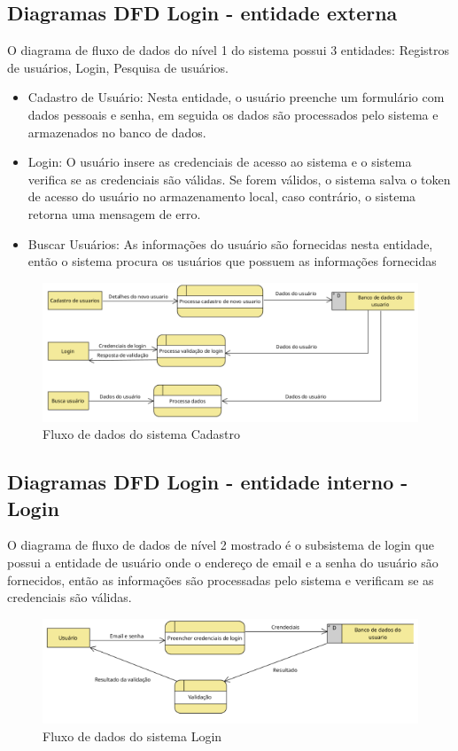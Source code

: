 \subsection{Diagramas DFD Login - entidade externa}
O diagrama de fluxo de dados do nível 1 do sistema possui 3 entidades: Registros de usuários, Login, Pesquisa de usuários.
\begin{itemize}
      \item Cadastro de Usuário: Nesta entidade, o usuário preenche um formulário com dados pessoais e senha, em seguida os dados são processados pelo sistema e armazenados no banco de dados.
      \item Login: O usuário insere as credenciais de acesso ao sistema e o sistema verifica se as credenciais são válidas. Se forem válidos, o sistema salva o token de acesso do usuário no armazenamento local, caso contrário, o sistema retorna uma mensagem de erro.
      \item Buscar Usuários: As informações do usuário são fornecidas nesta entidade, então o sistema procura os usuários que possuem as informações fornecidas

\end{itemize}

\begin{figure}[H]
      \begin{center}
            \includegraphics[width=12cm]{Pictures/diagram/loginNv1.png}
            \caption{Fluxo de dados do sistema Cadastro} \label{loginNV1}
      \end{center}
\end{figure}

\subsection{Diagramas DFD Login - entidade interno - Login}
O diagrama de fluxo de dados de nível 2 mostrado é o subsistema de login que possui a entidade de usuário onde o endereço de email e a senha do usuário são fornecidos, então as informações são processadas pelo sistema e verificam se as credenciais são válidas.
\begin{figure}[H]
      \begin{center}
            \includegraphics[width=12cm]{Pictures/diagram/loginNv2.png}
            \caption{Fluxo de dados do sistema Login} \label{loginNV2}
      \end{center}
\end{figure}
